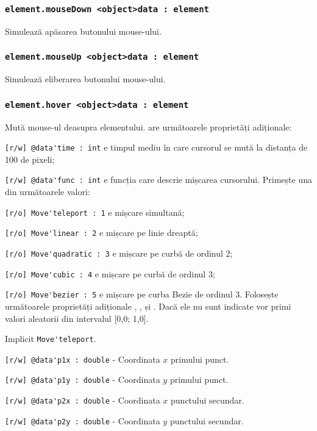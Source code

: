 \subsubsection{\lstinline|element.mouseDown <object>data : element|}

Simulează apăsarea butonului mouse-ului.

\subsubsection{\lstinline|element.mouseUp <object>data : element|}

Simulează eliberarea butonului mouse-ului.

\subsubsection{\lstinline|element.hover <object>data : element|}

Mută mouse-ul deasupra elementului.  are următoarele proprietăți adiționale:
\begin{icItems}
	\item \lstinline|[r/w] @data'time : int| e timpul mediu în care cursorul se mută la distanța de 100 de pixeli;
	\item \lstinline|[r/w] @data'func : int| e funcția care descrie mișcarea cursorului. Primește una din următoarele valori:
	\begin{icItems}
		\item \lstinline|[r/o] Move'teleport : 1| e mișcare simultană;
		\item \lstinline|[r/o] Move'linear : 2| e mișcare pe linie dreaptă;
		\item \lstinline|[r/o] Move'quadratic : 3| e mișcare pe curbă de ordinul 2;
		\item \lstinline|[r/o] Move'cubic : 4| e mișcare pe curbă de ordinul 3;
		\item \lstinline|[r/o] Move'bezier : 5| e mișcare pe curba Bezie de ordinul 3. Folosește următoarele proprietăți adiționale , ,  și . Dacă ele nu sunt indicate vor primi valori aleatorii din intervalul [0,0; 1,0].
	\end{icItems}
	Implicit \lstinline|Move'teleport|.
	\item \lstinline|[r/w] @data'p1x : double| - Coordinata $x$ primului punct.
	\item \lstinline|[r/w] @data'p1y : double| - Coordinata $y$ primului punct.
	\item \lstinline|[r/w] @data'p2x : double| - Coordinata $x$ punctului secundar.
	\item \lstinline|[r/w] @data'p2y : double| - Coordinata $y$ punctului secundar.
\end{icItems}

